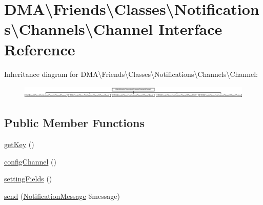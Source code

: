 \hypertarget{interfaceDMA_1_1Friends_1_1Classes_1_1Notifications_1_1Channels_1_1Channel}{\section{D\-M\-A\textbackslash{}Friends\textbackslash{}Classes\textbackslash{}Notifications\textbackslash{}Channels\textbackslash{}Channel Interface Reference}
\label{interfaceDMA_1_1Friends_1_1Classes_1_1Notifications_1_1Channels_1_1Channel}
}
Inheritance diagram for D\-M\-A\textbackslash{}Friends\textbackslash{}Classes\textbackslash{}Notifications\textbackslash{}Channels\textbackslash{}Channel\-:\begin{figure}[H]
\begin{center}
\leavevmode
\includegraphics[height=0.612022cm]{da/d85/interfaceDMA_1_1Friends_1_1Classes_1_1Notifications_1_1Channels_1_1Channel}
\end{center}
\end{figure}
\subsection*{Public Member Functions}
\begin{DoxyCompactItemize}
\item 
\hyperlink{interfaceDMA_1_1Friends_1_1Classes_1_1Notifications_1_1Channels_1_1Channel_a2a1520c4a04a9533e0c755229376eb8a}{get\-Key} ()
\item 
\hyperlink{interfaceDMA_1_1Friends_1_1Classes_1_1Notifications_1_1Channels_1_1Channel_a63df08fbca39589ea32f729d9485cb37}{config\-Channel} ()
\item 
\hyperlink{interfaceDMA_1_1Friends_1_1Classes_1_1Notifications_1_1Channels_1_1Channel_aa473115fa58a6fa5f57a9069f23dd771}{setting\-Fields} ()
\item 
\hyperlink{interfaceDMA_1_1Friends_1_1Classes_1_1Notifications_1_1Channels_1_1Channel_a8138dfd93ce9617213637789e793f4c7}{send} (\hyperlink{classDMA_1_1Friends_1_1Classes_1_1Notifications_1_1NotificationMessage}{Notification\-Message} \$message)
\end{DoxyCompactItemize}


